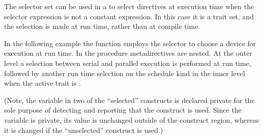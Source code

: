 \begin{ccppspecific}
\end{ccppspecific}



The  selector set can be used in a 
to select directives at execution time when the 
 selector expression is not a constant expression.
In this case it is a  trait set, and the selection is made at run time, rather
than at compile time.

In the following example the  function employs the 
selector to choose a device for execution at run time. 
In the  procedure metadirectives are nested.
At the outer level a selection between serial and parallel execution is performed
at run time, followed by another run time selection on the schedule kind in the inner
level when the active  trait is .

(Note, the variable  in two of the ``selected'' constructs is declared private for the sole purpose 
of detecting and reporting that the construct is used. Since the variable is private, its value 
is unchanged outside of the construct region, whereas it is changed if the ``unselected'' construct
is used.)





